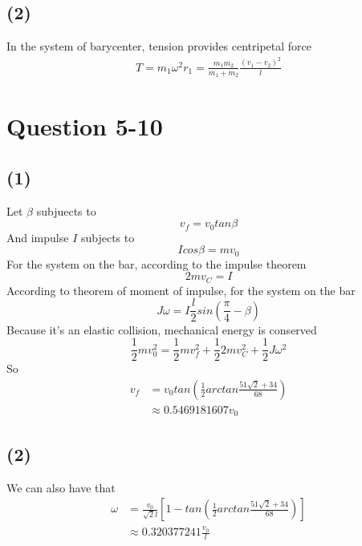 \documentclass[12pt,a4paper,twocolumn]{article}%
\begin{document}
		\subsection*{(2)}
		\noindent In the system of barycenter, tension provides centripetal force
		\begin{align*}
			T=m_1\omega^2r_1=\frac{m_1m_2}{m_1+m_2}\frac{(v_1-v_2)^2}{l}
		\end{align*}
		
		
		
		\section{Question 5-10}
		

		
		\subsection*{(1)}
		\noindent Let $\beta$ subjuects to
		\begin{equation}
			v_f=v_0tan\beta
		\end{equation}
		And impulse $I$ subjects to
		\begin{equation}
			Icos\beta=mv_0
		\end{equation}
		For the system on the bar, according to the impulse theorem
		\begin{equation}
			2mv_C=I
		\end{equation}
		According to theorem of moment of impulse, for the system on the bar
		\begin{equation}
			J\omega=I\frac{l}{2}sin(\frac{\pi}{4}-\beta)
		\end{equation}
		Because it's an elastic collision, mechanical energy is conserved
		\begin{equation}
			\frac{1}{2}{mv_0^2}=\frac{1}{2}{mv_f^2}+\frac{1}{2}2{mv_C^2}+\frac{1}{2}J\omega ^2
		\end{equation}
		So 
		\begin{align*}
			v_f&=v_0tan\left(\frac{1}{2}arctan\frac{51\sqrt{2}+34}{68}\right) \\
			&\approx0.5469181607v_0
		\end{align*}
		\subsection*{(2)}
		\noindent We can also have that
		\begin{align*}
			\omega&=\frac{v_0}{\sqrt{2}l}\left[1-tan\left(\frac{1}{2}arctan\frac{51\sqrt{2}+34}{68}\right)\right]\\
			&\approx 0.320377241\frac{v_0}{l}
		\end{align*}
\end{document}
